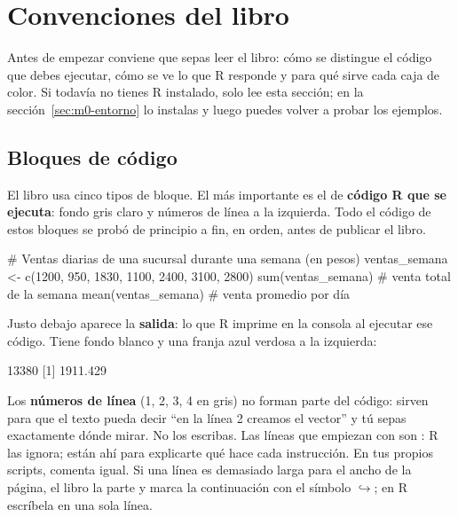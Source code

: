 \section{Convenciones del libro}
\label{sec:m0-convenciones}

Antes de empezar conviene que sepas leer el libro: cómo se distingue el
código que debes ejecutar, cómo se ve lo que R responde y para qué sirve
cada caja de color. Si todavía no tienes R instalado, solo lee esta sección;
en la sección~\ref{sec:m0-entorno} lo instalas y luego puedes volver a
probar los ejemplos.

\subsection{Bloques de código}

El libro usa cinco tipos de bloque. El más importante es el de
\textbf{código R que se ejecuta}: fondo gris claro y números de línea a la
izquierda. Todo el código de estos bloques se probó de principio a fin, en
orden, antes de publicar el libro.

\begin{rcode}
# Ventas diarias de una sucursal durante una semana (en pesos)
ventas_semana <- c(1200, 950, 1830, 1100, 2400, 3100, 2800)
sum(ventas_semana)    # venta total de la semana
mean(ventas_semana)   # venta promedio por día
\end{rcode}

Justo debajo aparece la \textbf{salida}: lo que R imprime en la consola al
ejecutar ese código. Tiene fondo blanco y una franja azul verdosa a la
izquierda:

\begin{rsalida}
[1] 13380
[1] 1911.429
\end{rsalida}

Los \textbf{números de línea} (1, 2, 3, 4 en gris) no forman parte del
código: sirven para que el texto pueda decir ``en la línea 2 creamos el
vector'' y tú sepas exactamente dónde mirar. No los escribas. Las líneas que
empiezan con \codigo{\#} son : R las ignora; están ahí
para explicarte qué hace cada instrucción. En tus propios scripts, comenta
igual. Si una línea es demasiado larga para el ancho de la página, el libro
la parte y marca la continuación con el símbolo $\hookrightarrow$; en R
escríbela en una sola línea.

